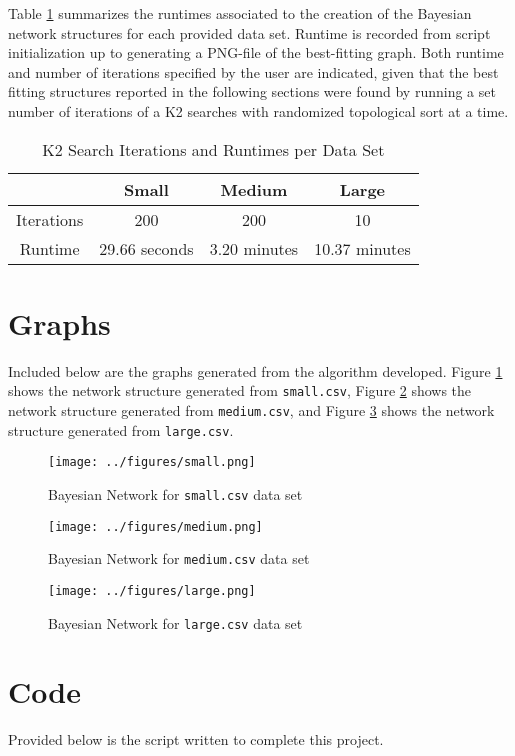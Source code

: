 \documentclass[twoside,11pt]{article}
\begin{document}
Table \ref{table:run} summarizes the runtimes associated to the creation of the Bayesian network structures for each provided data set. Runtime is recorded from script initialization up to generating a PNG-file of the best-fitting graph. Both runtime and number of iterations specified by the user are indicated, given that the best fitting structures reported in the following sections were found by running a set number of iterations of a K2 searches with randomized topological sort at a time.

\begin{table}[H]
\centering
\begin{tabular}{|c|c|c|c|}
\hline
                & \textbf{Small} & \textbf{Medium} & \textbf{Large} \\ \hline
Iterations     &        200        &      200           &       10         \\ \hline
Runtime & 29.66 seconds  & 3.20 minutes    &       10.37 minutes         \\ \hline
\end{tabular}
\caption{K2 Search Iterations and Runtimes per Data Set}
\label{table:run}
\end{table}
\section{Graphs}
\label{sec:graphs}
Included below are the graphs generated from the algorithm developed. Figure \ref{fig:small} shows the network structure generated from \texttt{small.csv}, Figure \ref{fig:medium} shows the network structure generated from \texttt{medium.csv}, and Figure \ref{fig:large} shows the network structure generated from \texttt{large.csv}.

\begin{figure}[H]
    \centering
    \texttt{[image: ../figures/small.png]}
    \caption{Bayesian Network for \texttt{small.csv} data set}
    \label{fig:small}
\end{figure}

\begin{figure}[H]
    \centering
    \texttt{[image: ../figures/medium.png]}
    \caption{Bayesian Network for \texttt{medium.csv} data set}
    \label{fig:medium}
\end{figure}

\begin{figure}[H]
    \centering
    \texttt{[image: ../figures/large.png]}
    \caption{Bayesian Network for \texttt{large.csv} data set}
    \label{fig:large}
\end{figure}


\section{Code}
\label{sec:code}
Provided below is the script written to complete this project.
\begin{algorithm}



\end{algorithm}
\end{document}
